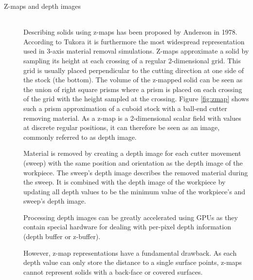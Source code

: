 \begin{description}
	 
	\item[Z-maps and depth images] \hfill \\
	Describing solids using z-maps has been proposed by Anderson \cite{zmap} in 1978.
	According to Tukora it is furthermore the most widespread representation used in 3-axis material removal simulations.
	Z-maps approximate a solid by sampling its height at each crossing of a regular 2-dimensional grid.
	This grid is usually placed perpendicular to the cutting direction at one side of the stock (\eg the bottom).
	The volume of the z-mapped solid can be seen as the union of right square prisms where a prism is placed on each crossing of the grid with the height sampled at the crossing.
	Figure \ref{fig:zmap} shows such a prism approximation of a cuboid stock with a ball-end cutter removing material.
	As a z-map is a 2-dimensional scalar field with values at discrete regular positions, it can therefore be seen as an image, commonly referred to as depth image.
	
	Material is removed by creating a depth image for each cutter movement (\aka sweep) with the same position and orientation as the depth image of the workpiece.
	The sweep's depth image describes the removed material during the sweep.
	It is combined with the depth image of the workpiece by updating all depth values to be the minimum value of the workpiece's and sweep's depth image.

	Processing depth images can be greatly accelerated using GPUs as they contain special hardware for dealing with per-pixel depth information (\ie depth buffer or z-buffer).
	
	However, z-map representations have a fundamental drawback.
	As each depth value can only store the distance to a single surface points, z-maps cannot represent solids with a back-face or covered surfaces.
	

\end{description}
